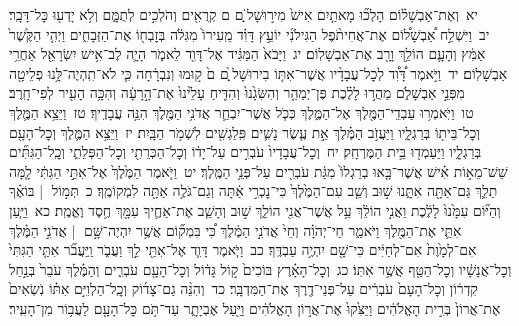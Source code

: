 \documentclass[18pt]{article}
\newcommand{\kri}[1]{\Afootnote{#1}}	%
\begin{document}
 {\loc יא~}וְאֶת־אַבְשָׁל֗וֹם הָלְכ֞וּ מָאתַ֤יִם אִישׁ֙ מִיר֣וּשָׁל ַ֔͏ְם ם קְרֻאִ֖ים וְהֹלְכִ֣ים לְתֻמָּ֑ם וְלֹ֥א יָדְע֖וּ כׇּל־דָּבָֽר׃ \startlock
 {\loc יב~}וַיִּשְׁלַ֣ח אַ֠בְשָׁל֠וֹם אֶת־אֲחִיתֹ֨פֶל הַגִּילֹנִ֜י יוֹעֵ֣ץ דָּוִ֗ד מֵֽעִירוֹ֙ מִגִּלֹ֔ה בְּזׇבְח֖וֹ אֶת־הַזְּבָחִ֑ים וַיְהִ֤י הַקֶּ֙שֶׁר֙ אַמִּ֔ץ וְהָעָ֛ם הוֹלֵ֥ךְ וָרָ֖ב אֶת־אַבְשָׁלֽוֹם׃ \startlock
 {\loc יג~}וַיָּבֹא֙ הַמַּגִּ֔יד אֶל־דָּוִ֖ד לֵאמֹ֑ר הָיָ֛ה לֶב־אִ֥ישׁ יִשְׂרָאֵ֖ל אַחֲרֵ֥י אַבְשָׁלֽוֹם׃ \startlock
 {\loc יד~}וַיֹּ֣אמֶר דָּ֠וִ֠ד לְכׇל־עֲבָדָ֨יו אֲשֶׁר־אִתּ֤וֹ בִירוּשָׁל ַ֙͏ְם ם֙ ק֣וּמוּ וְנִבְרָ֔חָה כִּ֛י לֹא־תִֽהְיֶה־לָּ֥נוּ פְלֵיטָ֖ה מִפְּנֵ֣י אַבְשָׁלֹ֑ם מַהֲר֣וּ לָלֶ֗כֶת פֶּן־יְמַהֵ֤ר וְהִשִּׂגָ֙נוּ֙ וְהִדִּ֤יחַ עָלֵ֙ינוּ֙ אֶת־הָ֣רָעָ֔ה וְהִכָּ֥ה הָעִ֖יר לְפִי־חָֽרֶב׃ \startlock
 {\loc טו~}וַיֹּֽאמְר֥וּ עַבְדֵֽי־הַמֶּ֖לֶךְ אֶל־הַמֶּ֑לֶךְ כְּכֹ֧ל אֲשֶׁר־יִבְחַ֛ר אֲדֹנִ֥י הַמֶּ֖לֶךְ הִנֵּ֥ה עֲבָדֶֽיךָ׃ \startlock
 {\loc טז~}וַיֵּצֵ֥א הַמֶּ֛לֶךְ וְכׇל־בֵּית֖וֹ בְּרַגְלָ֑יו וַיַּעֲזֹ֣ב הַמֶּ֗לֶךְ אֵ֣ת עֶ֧שֶׂר נָשִׁ֛ים פִּֽלַגְשִׁ֖ים לִשְׁמֹ֥ר הַבָּֽיִת׃ \startlock
 {\loc יז~}וַיֵּצֵ֥א הַמֶּ֛לֶךְ וְכׇל־הָעָ֖ם בְּרַגְלָ֑יו וַיַּעַמְד֖וּ בֵּ֥ית הַמֶּרְחָֽק׃ \startlock
 {\loc יח~}וְכׇל־עֲבָדָיו֙ עֹבְרִ֣ים עַל־יָד֔וֹ וְכׇל־הַכְּרֵתִ֖י וְכׇל־הַפְּלֵתִ֑י וְכׇֽל־הַגִּתִּ֞ים שֵׁשׁ־מֵא֣וֹת אִ֗ישׁ אֲשֶׁר־בָּ֤אוּ בְרַגְלוֹ֙ מִגַּ֔ת עֹבְרִ֖ים עַל־פְּנֵ֥י הַמֶּֽלֶךְ׃ \startlock
 {\loc יט~}וַיֹּ֤אמֶר הַמֶּ֙לֶךְ֙ אֶל־אִתַּ֣י הַגִּתִּ֔י לָ֧מָּה תֵלֵ֛ךְ גַּם־אַתָּ֖ה אִתָּ֑נוּ שׁ֣וּב וְשֵׁ֤ב עִם־הַמֶּ֙לֶךְ֙ כִּי־נׇכְרִ֣י אַ֔תָּה וְגַם־גֹּלֶ֥ה אַתָּ֖ה לִמְקוֹמֶֽךָ׃ \startlock
 {\loc כ~}תְּמ֣וֹל  |  בּוֹאֶ֗ךָ וְהַיּ֞וֹם  \edtext{(אנועך)}{\kri{קרי: אֲנִֽיעֲךָ֤}}  עִמָּ֙נוּ֙ לָלֶ֔כֶת וַאֲנִ֣י הוֹלֵ֔ךְ עַ֥ל אֲשֶׁר־אֲנִ֖י הוֹלֵ֑ךְ שׁ֣וּב וְהָשֵׁ֧ב אֶת־אַחֶ֛יךָ עִמָּ֖ךְ חֶ֥סֶד וֶאֱמֶֽת׃ \startlock
 {\loc כא~}וַיַּ֧עַן אִתַּ֛י אֶת־הַמֶּ֖לֶךְ וַיֹּאמַ֑ר חַי־יְהֹוָ֗ה וְחֵי֙ אֲדֹנִ֣י הַמֶּ֔לֶךְ כִּ֠י  \edtext{((אם))}{\kri{כתיב ולא קרי}}  בִּמְק֞וֹם אֲשֶׁ֥ר יִהְיֶה־שָּׁ֣ם  |  אֲדֹנִ֣י הַמֶּ֗לֶךְ אִם־לְמָ֙וֶת֙ אִם־לְחַיִּ֔ים כִּי־שָׁ֖ם יִהְיֶ֥ה עַבְדֶּֽךָ׃ \startlock
 {\loc כב~}וַיֹּ֧אמֶר דָּוִ֛ד אֶל־אִתַּ֖י לֵ֣ךְ וַעֲבֹ֑ר וַֽיַּעֲבֹ֞ר אִתַּ֤י הַגִּתִּי֙ וְכׇל־אֲנָשָׁ֔יו וְכׇל־הַטַּ֖ף אֲשֶׁ֥ר אִתּֽוֹ׃ \startlock
 {\loc כג~}וְכׇל־הָאָ֗רֶץ בּוֹכִים֙ ק֣וֹל גָּד֔וֹל וְכׇל־הָעָ֖ם עֹבְרִ֑ים וְהַמֶּ֗לֶךְ עֹבֵר֙ בְּנַ֣חַל קִדְר֔וֹן וְכׇל־הָעָם֙ עֹבְרִ֔ים עַל־פְּנֵי־דֶ֖רֶךְ אֶת־הַמִּדְבָּֽר׃ \startlock
 {\loc כד~}וְהִנֵּ֨ה גַם־צָד֜וֹק וְכׇֽל־הַלְוִיִּ֣ם אִתּ֗וֹ נֹֽשְׂאִים֙ אֶת־אֲרוֹן֙ בְּרִ֣ית הָאֱלֹהִ֔ים וַיַּצִּ֙קוּ֙ אֶת־אֲר֣וֹן הָאֱלֹהִ֔ים וַיַּ֖עַל אֶבְיָתָ֑ר עַד־תֹּ֥ם כׇּל־הָעָ֖ם לַעֲב֥וֹר מִן־הָעִֽיר׃ \startlock
\end{document}
